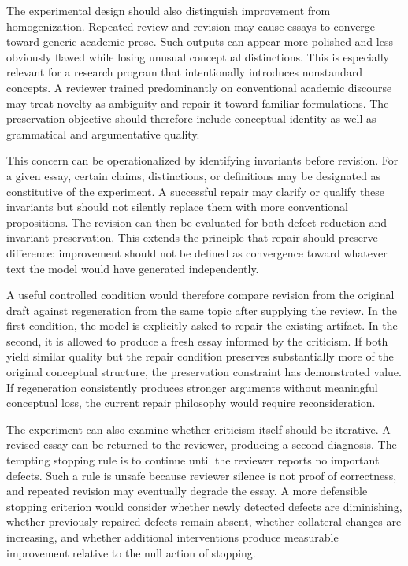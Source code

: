 \documentclass[11pt]{article}
\begin{document}
The experimental design should also distinguish improvement from homogenization. Repeated review and revision may cause essays to converge toward generic academic prose. Such outputs can appear more polished and less obviously flawed while losing unusual conceptual distinctions. This is especially relevant for a research program that intentionally introduces nonstandard concepts. A reviewer trained predominantly on conventional academic discourse may treat novelty as ambiguity and repair it toward familiar formulations. The preservation objective should therefore include conceptual identity as well as grammatical and argumentative quality.

This concern can be operationalized by identifying invariants before revision. For a given essay, certain claims, distinctions, or definitions may be designated as constitutive of the experiment. A successful repair may clarify or qualify these invariants but should not silently replace them with more conventional propositions. The revision can then be evaluated for both defect reduction and invariant preservation. This extends the principle that repair should preserve difference: improvement should not be defined as convergence toward whatever text the model would have generated independently.

A useful controlled condition would therefore compare revision from the original draft against regeneration from the same topic after supplying the review. In the first condition, the model is explicitly asked to repair the existing artifact. In the second, it is allowed to produce a fresh essay informed by the criticism. If both yield similar quality but the repair condition preserves substantially more of the original conceptual structure, the preservation constraint has demonstrated value. If regeneration consistently produces stronger arguments without meaningful conceptual loss, the current repair philosophy would require reconsideration.

The experiment can also examine whether criticism itself should be iterative. A revised essay can be returned to the reviewer, producing a second diagnosis. The tempting stopping rule is to continue until the reviewer reports no important defects. Such a rule is unsafe because reviewer silence is not proof of correctness, and repeated revision may eventually degrade the essay. A more defensible stopping criterion would consider whether newly detected defects are diminishing, whether previously repaired defects remain absent, whether collateral changes are increasing, and whether additional interventions produce measurable improvement relative to the null action of stopping.
\end{document}
